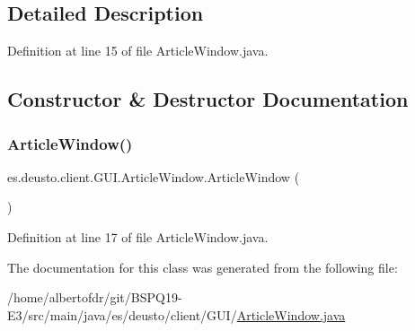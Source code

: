 \subsection{Detailed Description}


Definition at line 15 of file Article\+Window.\+java.



\subsection{Constructor \& Destructor Documentation}
\mbox{\label{classes_1_1deusto_1_1client_1_1_g_u_i_1_1_article_window_a32785c5a8d12fccb60c87c7dacf53e7f}} 
\subsubsection{\texorpdfstring{Article\+Window()}{ArticleWindow()}}
{\footnotesize\ttfamily es.\+deusto.\+client.\+G\+U\+I.\+Article\+Window.\+Article\+Window (\begin{DoxyParamCaption}{ }\end{DoxyParamCaption})}



Definition at line 17 of file Article\+Window.\+java.



The documentation for this class was generated from the following file\+:\begin{DoxyCompactItemize}
\item 
/home/albertofdr/git/\+B\+S\+P\+Q19-\/\+E3/src/main/java/es/deusto/client/\+G\+U\+I/\hyperlink{_article_window_8java}{Article\+Window.\+java}\end{DoxyCompactItemize}
